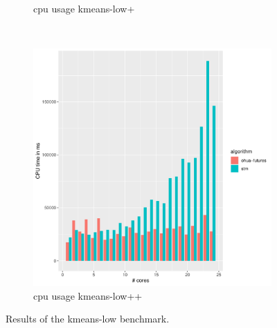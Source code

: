 \begin{figure}
\begin{subfigure}[t]{.32\textwidth}
        \caption{cpu usage kmeans-low+}%
    \end{subfigure}%
    ~
    \begin{subfigure}[t]{.32\textwidth}
        \includegraphics[width=\textwidth,keepaspectratio]{gfx/results/kmeans/kmeans-low++_cpu}
        \caption{cpu usage kmeans-low++}%
    \end{subfigure}%
    \caption{Results of the kmeans-low benchmark.}%
    \label{fig:evaulation:kmeans-low}
\end{figure}

